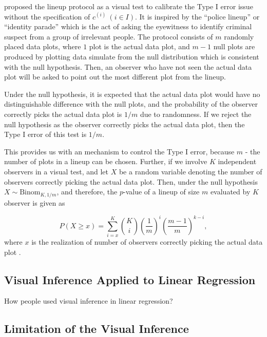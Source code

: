 \documentclass{monashthesis}
\begin{document}
\textcite{buja_statistical_2009} proposed the lineup protocol as a visual test to calibrate the Type I error issue without the specification of \(c^{(i)}~(i \in I)\). It is inspired by the ``police lineup'' or ``identity parade'' which is the act of asking the eyewitness to identify criminal suspect from a group of irrelevant people. The protocol consists of \(m\) randomly placed data plots, where \(1\) plot is the actual data plot, and \(m-1\) null plots are produced by plotting data simulate from the null distribution which is consistent with the null hypothesis. Then, an observer who have not seen the actual data plot will be asked to point out the most different plot from the lineup.

Under the null hypothesis, it is expected that the actual data plot would have no distinguishable difference with the null plots, and the probability of the observer correctly picks the actual data plot is \(1/m\) due to randomness. If we reject the null hypothesis as the observer correctly picks the actual data plot, then the Type I error of this test is \(1/m\).

This provides us with an mechanism to control the Type I error, because \(m\) - the number of plots in a lineup can be chosen. Further, if we involve \(K\) independent observers in a visual test, and let \(X\) be a random variable denoting the number of observers correctly picking the actual data plot. Then, under the null hypothesis \(X \sim \mathrm{Binom}_{K,1/m}\), and therefore, the \(p\)-value of a lineup of size \(m\) evaluated by \(K\) observer is given as

\[P(X \geq x) = \sum_{i=x}^{K}{{K}\choose{i}}\left(\frac{1}{m}\right)^i\left(\frac{m-1}{m}\right)^{k-i},\]
where \(x\) is the realization of number of observers correctly picking the actual data plot \autocite{majumder_validation_2013}.

\hypertarget{visual-inference-applied-to-linear-regression}{%
\subsection{Visual Inference Applied to Linear Regression}\label{visual-inference-applied-to-linear-regression}}

How people used visual inference in linear regression?

\hypertarget{limitation-of-the-visual-inference}{%
\subsection{Limitation of the Visual Inference}\label{limitation-of-the-visual-inference}}
\end{document}
